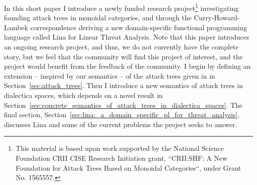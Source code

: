 \documentclass{llncs}
\begin{document}
In this short paper I introduce a newly funded research
project\footnote{This material is based upon work supported by the
  National Science Foundation CRII CISE Research Initiation grant,
  ``CRII:SHF: A New Foundation for Attack Trees Based on Monoidal
  Categories``, under Grant No. 1565557.}  investigating founding
attack trees in monoidal categories, and through the
Curry-Howard-Lambek correspondence deriving a new domain-specific
functional programming language called Lina for Linear Threat
Analysis.  Note that this paper introduces an ongoing research
project, and thus, we do not currently have the complete story, but we
feel that the community will find this project of interest, and the
project would benefit from the feedback of the community.  I begin by
defining an extension -- inspired by our semantics -- of the attack
trees given in \cite{Jhawar:2015} in Section~\ref{sec:attack_trees}.
Then I introduce a new semantics of attack trees in dialectica spaces,
which depends on a novel result in
Section~\ref{sec:concrete_semantics_of_attack_trees_in_dialectica_spaces}.
The final section,
Section~\ref{sec:lina:_a_domain_specific_pl_for_threat_analysis},
discusses Lina and some of the current problems the project seeks to
answer.
\end{document}
